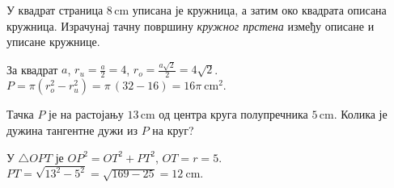 \documentclass[11pt,a5paper,twoside,addpoints,noanswers]{exam} %
\newcommand{\measure}[2]{#1\,\mathrm{#2}}
\newcommand{\variant}[3]{#1}
\begin{document}
\begin{questions}
\question[4]
\variant{
У квадрат страница $\measure{8}{cm}$ уписана је кружница, а затим око квадрата описана кружница.
Израчунај тачну површину \emph{кружног прстена} између описане и уписане кружнице.
}{
У једнакостранични троугао страница $\measure{6}{cm}$ уписана је кружница, а затим описана кружница.
Израчунај тачну површину \emph{кружног прстена} између њих.
}{
Правоугаоник има странице $\measure{6}{cm}$ и $\measure{8}{cm}$.
Уписана и описана кружница не постоје обе; зато израчунај \emph{тачну} површину круга чији је пречник једнак дужини дијагонале тог правоугаоника.
}
\begin{solution}[\stretch 4]
\variant{
За квадрат $a$, $r_u=\tfrac a2=4$, $r_o=\tfrac{a\sqrt2}{2}=4\sqrt2$.
$P=\pi(r_o^2-r_u^2)=\pi\,(32-16)=16\pi\ \mathrm{cm}^2$.
}{
За једнакостранични троугао $a$, $r_u=\tfrac{a\sqrt3}{6}$, $r_o=\tfrac{a\sqrt3}{3}$.
За $a=6$: $r_u=\sqrt3$, $r_o=2\sqrt3$.
$P=\pi( (2\sqrt3)^2-(\sqrt3)^2 )=\pi(12-3)=9\pi\ \mathrm{cm}^2$.
}{
Дијагонала: $d=\sqrt{6^2+8^2}=10$ (Питагорина).
Круг са пречником $d$ има полупречник $5$, па је $P=25\pi\ \mathrm{cm}^2$.
}
\end{solution}


\question[3]
\variant{
Тачка $P$ је на растојању $\measure{13}{cm}$ од центра круга полупречника $\measure{5}{cm}$.
Колика је дужина тангентне дужи из $P$ на круг?
}{
Полупречник круга је $\measure{10}{cm}$. Израчунај дужину лука од $\,\measure{25}{cm}$ у степенима (централни угао).
}{
Полупречник круга је $\measure{6}{cm}$. Нађи површину круга \emph{приближно} ($\pi\approx3{,}14$).
}
\begin{solution}[\stretch 2]
\variant{
У $\triangle OPT$ је $OP^2=OT^2+PT^2$, $OT=r=5$.
$PT=\sqrt{13^2-5^2}=\sqrt{169-25}=12\ \mathrm{cm}$.
}{
$l=\dfrac{\alpha}{360^\circ}\cdot 2\pi r\Rightarrow
\alpha=\dfrac{360^\circ\,l}{2\pi r}
=\dfrac{360\cdot 25}{20\pi}
=\dfrac{450}{\pi}^\circ\approx 143{,}24^\circ.$
}{
$P=r^2\pi=36\cdot 3{,}14=113{,}04\ \mathrm{cm}^2$.
}
\end{solution}

\end{questions}
\end{document}

